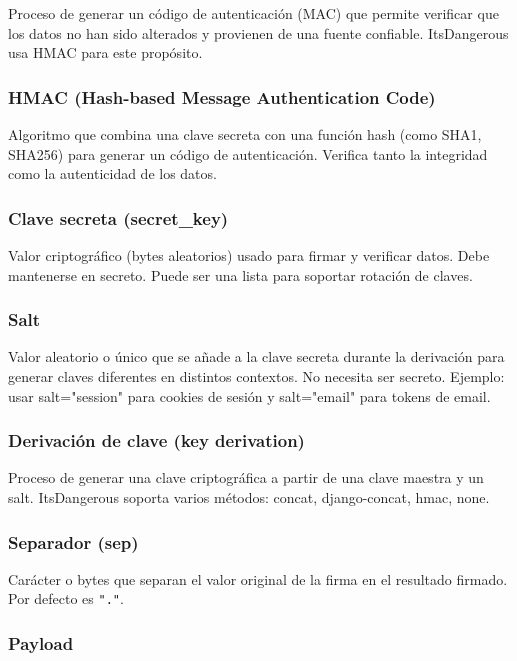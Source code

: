 \documentclass[11pt,a4paper]{article}
\begin{document}
Proceso de generar un código de autenticación (MAC) que permite verificar que los datos no han sido alterados y provienen de una fuente confiable. ItsDangerous usa HMAC para este propósito.


\subsubsection*{HMAC (Hash-based Message Authentication Code)}


Algoritmo que combina una clave secreta con una función hash (como SHA1, SHA256) para generar un código de autenticación. Verifica tanto la integridad como la autenticidad de los datos.


\subsubsection*{Clave secreta (secret\_key)}


Valor criptográfico (bytes aleatorios) usado para firmar y verificar datos. Debe mantenerse en secreto. Puede ser una lista para soportar rotación de claves.


\subsubsection*{Salt}


Valor aleatorio o único que se añade a la clave secreta durante la derivación para generar claves diferentes en distintos contextos. No necesita ser secreto. Ejemplo: usar salt="session" para cookies de sesión y salt="email" para tokens de email.


\subsubsection*{Derivación de clave (key derivation)}


Proceso de generar una clave criptográfica a partir de una clave maestra y un salt. ItsDangerous soporta varios métodos: concat, django-concat, hmac, none.


\subsubsection*{Separador (sep)}


Carácter o bytes que separan el valor original de la firma en el resultado firmado. Por defecto es \texttt{"."}.


\subsubsection*{Payload}
\end{document}
